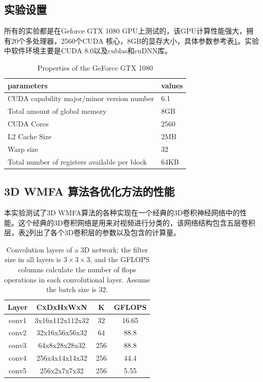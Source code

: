 \subsection{实验设置}
所有的实验都是在Geforce GTX 1080 GPU上测试的，该GPU计算性能强大，拥有20个多处理器，2560个CUDA 核心，8GB的显存大小，具体参数参考表\ref{my-label}。实验中软件环境主要是CUDA 8.0以及cublas和cuDNN库。
\begin{table}[]
\centering
\caption{Properties of the GeForce GTX 1080}
\label{my-label}
\begin{tabular}{l|l}
\hline
parameters                                    & values \\ \hline
CUDA capability major/minor version number    & 6.1    \\ \hline
Total amount of global memory                 & 8GB    \\ \hline
CUDA Cores                                    & 2560   \\ \hline
L2 Cache Size                                 & 2MB    \\ \hline
Warp size                                     & 32     \\ \hline
Total number of registers available per block & 64KB   \\ \hline
\end{tabular}
\end{table}


\subsection{3D WMFA 算法各优化方法的性能}
本实验测试了3D WMFA算法的各种实现在一个经典的3D卷积神经网络中的性能。这个经典的3D卷积网络是用来对视频进行分类的，该网络结构包含五层卷积层，表\ref{conv3d-info}列出了各个3D卷积层的参数以及包含的计算量。
\begin{table}[]
\centering
\caption{Convolution layers of a 3D network; the filter size in all layers is $3\times 3\times 3$, and the GFLOPS columns calculate the number of flops operations in each convolutional layer. Assume the batch size is $32$.}
\label{conv3d-info}
\begin{tabular}{|c|c|c|c|}
\hline
Layer & CxDxHxWxN       & K   & GFLOPS \\ \hline
conv1 & 3x16x112x112x32 & 32  & 16.65   \\ \hline
conv2 & 32x16x56x56x32  & 64  & 88.8  \\ \hline
conv3 & 64x8x28x28x32   & 256 & 88.8  \\ \hline
conv4 & 256x4x14x14x32  & 256 & 44.4   \\ \hline
conv5 & 256x2x7x7x32    & 256 & 5.55   \\ \hline
\end{tabular}
\end{table} 

